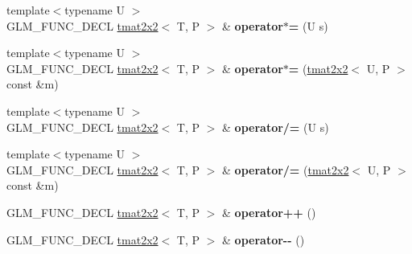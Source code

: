 \begin{DoxyCompactItemize}
\item 
\hypertarget{structglm_1_1detail_1_1tmat2x2_a981d962c4d65dc12703e2b6e723ec981}{{\footnotesize template$<$typename U $>$ }\\G\-L\-M\-\_\-\-F\-U\-N\-C\-\_\-\-D\-E\-C\-L \hyperlink{structglm_1_1detail_1_1tmat2x2}{tmat2x2}$<$ T, P $>$ \& {\bfseries operator$\ast$=} (U s)}\label{structglm_1_1detail_1_1tmat2x2_a981d962c4d65dc12703e2b6e723ec981}

\item 
\hypertarget{structglm_1_1detail_1_1tmat2x2_ab56306a2ba75e6dbdd7eed704d6a90df}{{\footnotesize template$<$typename U $>$ }\\G\-L\-M\-\_\-\-F\-U\-N\-C\-\_\-\-D\-E\-C\-L \hyperlink{structglm_1_1detail_1_1tmat2x2}{tmat2x2}$<$ T, P $>$ \& {\bfseries operator$\ast$=} (\hyperlink{structglm_1_1detail_1_1tmat2x2}{tmat2x2}$<$ U, P $>$ const \&m)}\label{structglm_1_1detail_1_1tmat2x2_ab56306a2ba75e6dbdd7eed704d6a90df}

\item 
\hypertarget{structglm_1_1detail_1_1tmat2x2_a646ced88a0720120d4664a65a5a5ae29}{{\footnotesize template$<$typename U $>$ }\\G\-L\-M\-\_\-\-F\-U\-N\-C\-\_\-\-D\-E\-C\-L \hyperlink{structglm_1_1detail_1_1tmat2x2}{tmat2x2}$<$ T, P $>$ \& {\bfseries operator/=} (U s)}\label{structglm_1_1detail_1_1tmat2x2_a646ced88a0720120d4664a65a5a5ae29}

\item 
\hypertarget{structglm_1_1detail_1_1tmat2x2_adc3e315d4094456e7b9865b05bb13625}{{\footnotesize template$<$typename U $>$ }\\G\-L\-M\-\_\-\-F\-U\-N\-C\-\_\-\-D\-E\-C\-L \hyperlink{structglm_1_1detail_1_1tmat2x2}{tmat2x2}$<$ T, P $>$ \& {\bfseries operator/=} (\hyperlink{structglm_1_1detail_1_1tmat2x2}{tmat2x2}$<$ U, P $>$ const \&m)}\label{structglm_1_1detail_1_1tmat2x2_adc3e315d4094456e7b9865b05bb13625}

\item 
\hypertarget{structglm_1_1detail_1_1tmat2x2_ab22b8afc9da04be4ff28de825ccf0176}{G\-L\-M\-\_\-\-F\-U\-N\-C\-\_\-\-D\-E\-C\-L \hyperlink{structglm_1_1detail_1_1tmat2x2}{tmat2x2}$<$ T, P $>$ \& {\bfseries operator++} ()}\label{structglm_1_1detail_1_1tmat2x2_ab22b8afc9da04be4ff28de825ccf0176}

\item 
\hypertarget{structglm_1_1detail_1_1tmat2x2_a06b4e73ada53476205e52ce060506c90}{G\-L\-M\-\_\-\-F\-U\-N\-C\-\_\-\-D\-E\-C\-L \hyperlink{structglm_1_1detail_1_1tmat2x2}{tmat2x2}$<$ T, P $>$ \& {\bfseries operator-\/-\/} ()}\label{structglm_1_1detail_1_1tmat2x2_a06b4e73ada53476205e52ce060506c90}


\end{DoxyCompactItemize}
